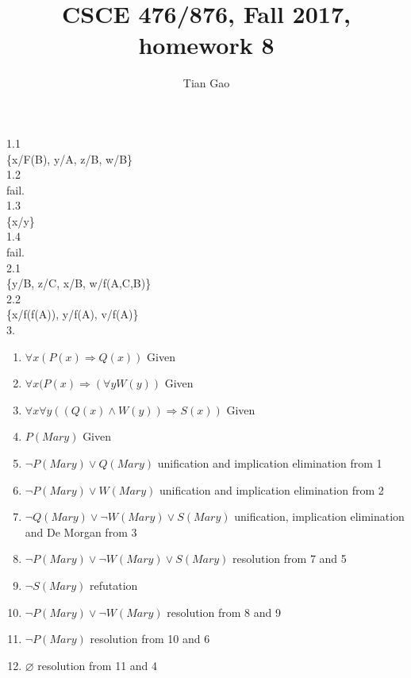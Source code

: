 \documentclass[a4paper]{article}
\title{CSCE 476/876, Fall 2017, homework 8}
\author{Tian Gao}
\begin{document}
\maketitle

1.1 \\
\{x/F(B), y/A, z/B, w/B\}\\

1.2\\
fail.\\

1.3\\
\{x/y\}\\

1.4\\
fail.\\

2.1\\
\{y/B, z/C, x/B, w/f(A,C,B)\}\\

2.2\\
\{x/f(f(A)), y/f(A), v/f(A)\}\\

3.\\
\begin{enumerate}[1.]
    \item $\forall x(P(x) \Rightarrow Q(x))$ \hfill Given
    \item $\forall x(P(x) \Rightarrow (\forall yW(y))$ \hfill Given
    \item $\forall x\forall y((Q(x) \wedge W(y)) \Rightarrow S(x))$ \hfill Given
    \item $P(Mary)$ \hfill Given
    \item $\neg P(Mary) \vee Q(Mary)$ \hfill unification and implication elimination from 1
    \item $\neg P(Mary) \vee W(Mary)$ \hfill unification and implication elimination from 2
    \item $\neg Q(Mary) \vee \neg W(Mary) \vee S(Mary)$ \hfill unification, implication elimination and De Morgan from 3
    \item $\neg P(Mary) \vee \neg W(Mary) \vee S(Mary)$ \hfill resolution from 7 and 5
    \item $\neg S(Mary)$ \hfill refutation
    \item $\neg P(Mary) \vee \neg W(Mary)$ \hfill resolution from 8 and 9
    \item $\neg P(Mary)$ \hfill resolution from 10 and 6
    \item $\varnothing$ \hfill resolution from 11 and 4
\end{enumerate}
\end{document}
